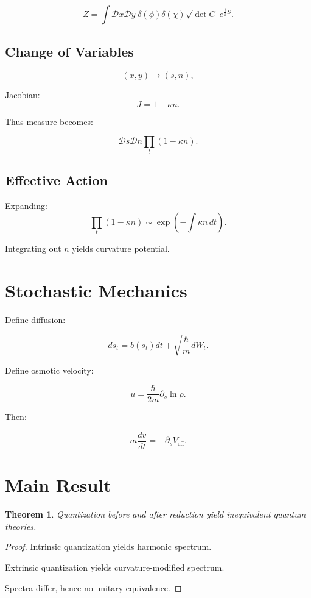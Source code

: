 \documentclass[11pt]{article}
\newtheorem{theorem}{Theorem}[section]
\begin{document}
\[
Z = \int \mathcal{D}x \mathcal{D}y\;
\delta(\phi)\delta(\chi)\sqrt{\det C}\;
e^{\frac{i}{\hbar}S}.
\]

\subsection{Change of Variables}

\[
(x,y) \to (s,n),
\]

Jacobian:
\[
J = 1 - \kappa n.
\]

Thus measure becomes:

\[
\mathcal{D}s \mathcal{D}n \prod_t (1-\kappa n).
\]

\subsection{Effective Action}

Expanding:
\[
\prod_t (1-\kappa n)
\sim \exp\left(-\int \kappa n \, dt\right).
\]

Integrating out $n$ yields curvature potential.

\section{Stochastic Mechanics}

Define diffusion:

\[
ds_t = b(s_t)dt + \sqrt{\frac{\hbar}{m}} dW_t.
\]

Define osmotic velocity:

\[
u = \frac{\hbar}{2m}\partial_s \ln \rho.
\]

Then:

\[
m\frac{dv}{dt} = -\partial_s V_{\mathrm{eff}}.
\]

\section{Main Result}

\begin{theorem}
Quantization before and after reduction yield inequivalent quantum theories.
\end{theorem}

\begin{proof}
Intrinsic quantization yields harmonic spectrum.

Extrinsic quantization yields curvature-modified spectrum.

Spectra differ, hence no unitary equivalence.
\end{proof}
\end{document}
